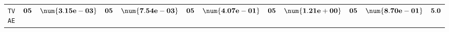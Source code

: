\begin{xltabular}{\textwidth}{l||cC|cC|cC|cC|cC||c}
	\texttt{TVAE} & $\bf 05$ & $\bf \num{3.15e-03}$ & $\bf 05$ & $\bf \num{7.54e-03}$ & $\bf 05$ & $\bf \num{4.07e-01}$ & $\bf 05$ & $\bf \num{1.21e+00}$ & $\bf 05$ & $\bf \num{8.70e-01}$ & $\bf 5.0$  \\
\end{xltabular}
